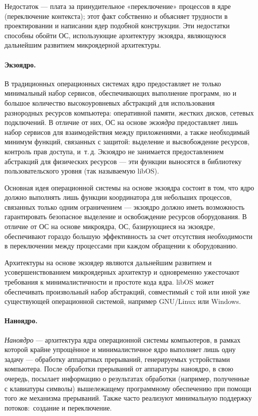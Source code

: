 Недостаток --- плата за принудительное «переключение» процессов в ядре (переключение контекста); этот факт собственно и объясняет трудности в проектировании и написании ядер подобной конструкции. Эти недостатки способны обойти ОС, использующие архитектуру экзоядра, являющуюся дальнейшим развитием микроядерной архитектуры.

\paragraph{Экзоядро.} В традиционных операционных системах ядро предоставляет не только минимальный набор сервисов, обеспечивающих выполнение программ, но и большое количество высокоуровневых абстракций для использования разнородных ресурсов компьютера: оперативной памяти, жестких дисков, сетевых подключений.
В отличие от них, ОС на основе \emph{экзоядра} предоставляет лишь набор сервисов для взаимодействия между приложениями, а также необходимый минимум функций, связанных с защитой: выделение и высвобождение ресурсов, контроль прав доступа, и~т.\,д. Экзоядро не занимается предоставлением абстракций для физических ресурсов --- эти функции выносятся в библиотеку пользовательского уровня (так называемую libOS).

Основная идея операционной системы на основе экзоядра состоит в том, что ядро должно выполнять лишь функции координатора для небольших процессов, связанных только одним ограничением --- экзоядро должно иметь возможность гарантировать безопасное выделение и освобождение ресурсов оборудования.
В отличие от ОС на основе микроядра, ОС, базирующиеся на экзоядре, обеспечивают гораздо большую эффективность за счет отсутствия необходимости в переключении между процессами при каждом обращении к оборудованию.

Архитектуры на основе экзоядер являются дальнейшим развитием и усовершенствованием микроядерных архитектур и одновременно ужесточают требования к минималистичности и простоте кода ядра. libOS может обеспечивать произвольный набор абстракций, совместимый с той или иной уже существующей операционной системой, например GNU/Linux или Windows.

\paragraph{Наноядро.} \emph{Наноядро} --- архитектура ядра операционной системы компьютеров, в рамках которой крайне упрощённое и минималистичное ядро выполняет лишь одну задачу --- обработку аппаратных прерываний, генерируемых устройствами компьютера.
После обработки прерываний от аппаратуры наноядро, в свою очередь, посылает информацию о результатах обработки (например, полученные с клавиатуры символы) вышележащему программному обеспечению при помощи того же механизма прерываний. Также часто реализуют минимальную поддержку потоков:~создание и переключение.

